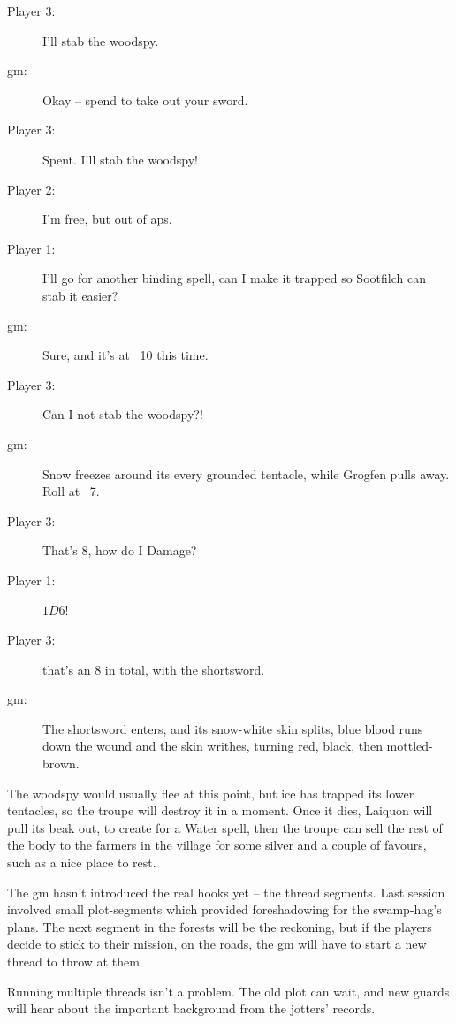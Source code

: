 \begin{multicols}{3}
\begin{description}
  \item[Player 3:]
  I'll stab the \gls{woodspy}.
  \item[\gls{gm}:]
  Okay -- spend  to take out your sword.
  \item[Player 3:]
  Spent.
  I'll stab the \gls{woodspy}!
  \item[Player 2:]
  I'm free, but out of \glspl{ap}.
  \item[Player 1:]
  I'll go for another binding spell, can I make it trapped so Sootfilch can stab it easier?
  \item[\gls{gm}:]
  Sure, and it's at ~10 this time.
  \item[Player 3:]
  Can I not stab the \gls{woodspy}?!
  \item[\gls{gm}:]
  Snow freezes around its every grounded tentacle, while Grogfen pulls away.
  Roll  at ~7.
  \item[Player 3:]
  That's 8, how do I Damage?
  \item[Player 1:]
  $1D6$!
  \item[Player 3:]
   that's an 8 in total, with the shortsword.
  \item[\gls{gm}:]
  The shortsword enters, and its snow-white skin splits, blue blood runs down the wound and the skin writhes, turning red, black, then mottled-brown.
\end{description}

\bigLine
\vspace{\baselineskip}

The \gls{woodspy} would usually flee at this point, but ice has trapped its lower tentacles, so the troupe will destroy it in a moment.
Once it dies, Laiquon will pull its beak out, to create  for a Water spell, then the troupe can sell the rest of the body to the farmers in the \gls{village} for some silver and a couple of favours, such as a nice place to rest.

The \gls{gm} hasn't introduced the real hooks yet -- the \gls{thread} \glspl{segment}.
Last session involved small plot-\glspl{segment} which provided foreshadowing for the swamp-hag's plans.
The next \gls{segment} in the forests will be the reckoning, but if the players decide to stick to their mission, on the roads, the \gls{gm} will have to start a new \gls{thread} to throw at them.

Running multiple \glspl{thread} isn't a problem.
The old plot can wait, and new \glspl{guard} will hear about the important background from the \glspl{jotter}' records.


\end{multicols}

